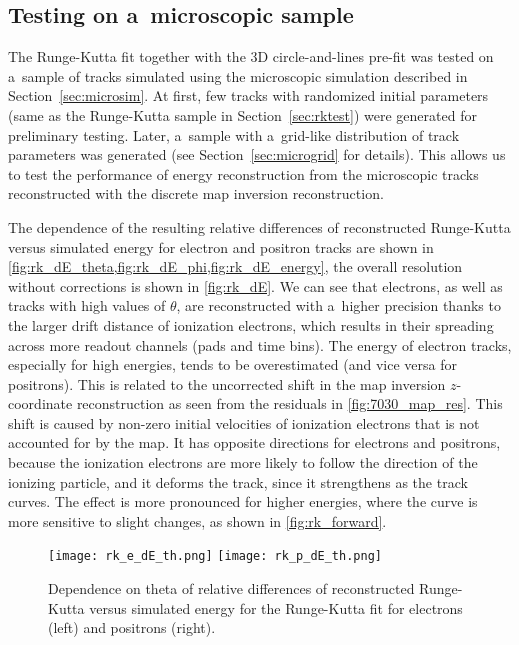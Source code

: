 		\subsection{Testing on a~microscopic sample}
			The Runge-Kutta fit together with the 3D circle-and-lines pre-fit was tested on a~sample of tracks simulated using the microscopic simulation described in Section~\ref{sec:microsim}. At first, few tracks with randomized initial parameters (same as the Runge-Kutta sample in Section~\ref{sec:rktest}) were generated for preliminary testing. Later, a~sample with a~grid-like distribution of track parameters was generated (see Section~\ref{sec:microgrid} for details). This allows us to test the performance of energy reconstruction from the microscopic tracks reconstructed with the discrete map inversion reconstruction.
			
			The dependence of the resulting relative differences of reconstructed Runge-Kutta versus simulated energy for electron and positron tracks are shown in \cref{fig:rk_dE_theta,fig:rk_dE_phi,fig:rk_dE_energy}, the overall resolution without corrections is shown in \cref{fig:rk_dE}. We can see that electrons, as well as tracks with high values of $\theta$, are reconstructed with a~higher precision thanks to the larger drift distance of ionization electrons, which results in their spreading across more readout channels (pads and time bins). The energy of electron tracks, especially for high energies, tends to be overestimated (and vice versa for positrons). This is related to the uncorrected shift in the map inversion $z$\nobreakdash-coordinate reconstruction as seen from the residuals in \cref{fig:7030_map_res}. This shift is caused by non-zero initial velocities of ionization electrons that is not accounted for by the map. It has opposite directions for electrons and positrons, because the ionization electrons are more likely to follow the direction of the ionizing particle, and it deforms the track, since it strengthens as the track curves. The effect is more pronounced for higher energies, where the curve is more sensitive to slight changes, as shown in \cref{fig:rk_forward}.

			\begin{figure}
				\centering
				\texttt{[image: rk\_e\_dE\_th.png]}
				\hfill
				\texttt{[image: rk\_p\_dE\_th.png]}
				\caption{Dependence on theta of relative differences of reconstructed Runge-Kutta versus simulated energy for the Runge-Kutta fit for electrons (left) and positrons (right).}
				\label{fig:rk_dE_theta}
			\end{figure}


